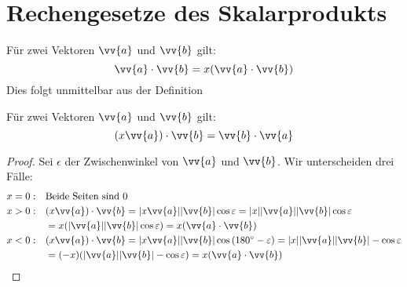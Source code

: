 \section{Rechengesetze des Skalarprodukts}
\begin{theorem}[Kommutativgesetz]
Für zwei Vektoren $\vv{a}$ und $\vv{b}$ gilt:
\[ \vv{a} \cdot \vv{b} = x( \vv{a} \cdot \vv{b}) \]
Dies folgt unmittelbar aus der Definition
\end{theorem}

\begin{theorem}[Assoziativgesetz]
Für zwei Vektoren $\vv{a}$ und $\vv{b}$ gilt:
\[ (x \vv{a}) \cdot \vv{b} = \vv{b} \cdot \vv{a} \]
\end{theorem}
\begin{proof}
Sei $\epsilon$ der Zwischenwinkel von $\vv{a}$ und $\vv{b}$. Wir unterscheiden drei Fälle:
\begin{align*}
x=0: \quad & \text{Beide Seiten sind } 0 \\
x>0: \quad & (x\vv{a}) \cdot \vv{b} = |x \vv{a}| |\vv{b}| \cos{\epsilon} = |x| |\vv{a}| |\vv{b}| \cos{\epsilon}\\
           & = x ( |\vv{a}| |\vv{b}| \cos{\epsilon} ) = x (\vv{a} \cdot \vv{b} )\\
x<0: \quad & (x\vv{a}) \cdot \vv{b} = |x \vv{a}| |\vv{b}| \cos{(\SI{180}{\degree} - \epsilon)} = |x| |\vv{a}| |\vv{b}| -\cos{\epsilon}\\
           & = (-x) ( |\vv{a}| |\vv{b}| -\cos{\epsilon} ) = x (\vv{a} \cdot \vv{b} )
\end{align*}
\end{proof}

